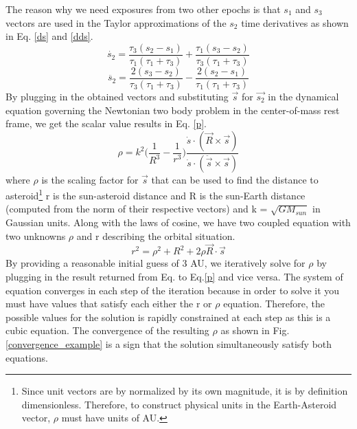 \documentclass[authoryear, 12pt,5p, times]{elsarticle}
\begin{document}
    The reason why we need exposures from two other epochs is that  $s_1$ and $s_3$ vectors are used in the Taylor approximations of the $s_2$ time derivatives as shown in Eq. \ref{ds} and \ref{dds}.
    \begin{equation}
    \dot{s_2} =\frac{\tau_3(s_2-s_1)}{\tau_1 (\tau_1+\tau_3)}+\frac{\tau_1(s_3-s_2)}{\tau_3(\tau_1+\tau_3)}
    \label{ds}
    \end{equation}
    \begin{equation}
      \ddot{s_2} =\frac{2(s_3-s_2)}{\tau_3 (\tau_1+\tau_3)}-\frac{2(s_2-s_1)}{\tau_1(\tau_1+\tau_3)}
    \label{dds}
    \end{equation} 
    By plugging in the obtained vectors and substituting $\vec{s}$ for $\vec{s_2}$ in the dynamical equation governing the Newtonian two body problem in the center-of-mass rest frame, we get the scalar value results in Eq. \ref{p}.
    \begin{equation}
    \rho = k^2\Bigg(\frac{1}{R^3}-\frac{1}{r^3}\Bigg)\frac{\dot{s}\cdot(\vec{R}\times \vec{s})}{\dot{s}\cdot(\ddot{\vec{s}}\times\vec{s})}
    \label{p}
    \end{equation}
    where $\rho$ is the scaling factor for $\vec{s}$ that can be used to find the distance to asteroid\footnote{Since unit vectors are by normalized by its own magnitude, it is by definition dimensionless. Therefore, to construct physical units in the Earth-Asteroid vector, $\rho$ must have units of AU.}
    r is the sun-asteroid distance and R is the sun-Earth distance (computed from the norm of their respective vectors) and k = $\sqrt{GM_{sun}}$ in Gaussian units.
    Along with the laws of cosine,  we have two coupled equation with two unknowns  $\rho$ and r describing the orbital situation.
    \begin{equation}
    r^2 = \rho^2+R^2+2\rho \vec{R}\cdot\vec{s}
    \label{r}
    \end{equation}
     By providing a reasonable initial guess of 3 AU, we iteratively solve for $\rho$ by plugging in the result returned from Eq.\label{r} to Eq.\ref{p} and vice versa. The system of equation converges in each step of the iteration because in order to solve it you must have values that satisfy each either the r or $\rho$ equation. Therefore, the possible values for the solution is rapidly constrained at each step as this is a cubic equation. The convergence of the resulting $\rho$ as shown in Fig.\ref{convergence_example} is a sign that the solution simultaneously satisfy both equations. 
    \label{iterative_soln}
\end{document}
